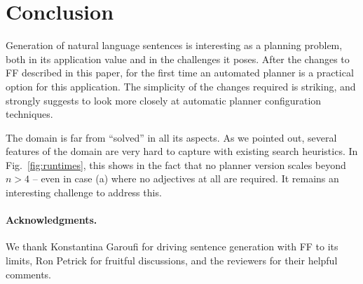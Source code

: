 
\section{Conclusion} \label{sec:conclusion}


Generation of natural language sentences is interesting as a planning
problem, both in its application value and in the challenges it
poses. After the changes to FF described in this paper, for the first
time an automated planner is a practical option for this
application. The simplicity of the changes required is striking, and
strongly suggests to look more closely at automatic planner
configuration techniques.


The domain is far from ``solved'' in all its aspects. As we pointed
out, several features of the domain are very hard to capture with
existing search heuristics. In Fig.~\ref{fig:runtimes}, this shows in
the fact that no planner version scales beyond $n>4$ -- even in case
(a) where no adjectives at all are required. It remains an interesting
challenge to address this.


\paragraph{Acknowledgments.} We thank Konstantina Garoufi for driving
sentence generation with FF to its limits, Ron Petrick for fruitful
discussions, and the reviewers for their helpful
comments. 




